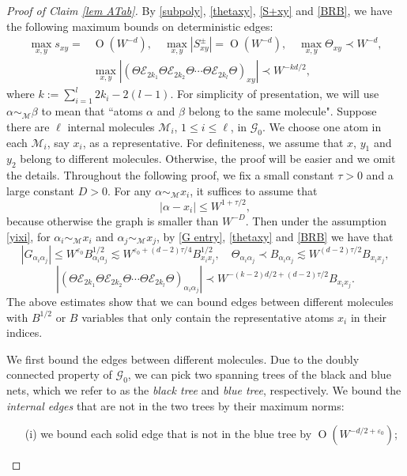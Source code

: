 \documentclass{article}
\newcommand{\1}{\mathds{1}}
\numberwithin{equation}{section}
\newcommand{\al}{\alpha}
\newcommand{\be}{\begin{equation}}
\newcommand{\ee}{\end{equation}}
\newcommand{\e}{{\varepsilon}}
\renewcommand{\cal}{\mathcal}
\renewcommand{\leq}{\leqslant}
\renewcommand{\le}{\leq}
\newcommand{\dashed}{\text{diffusive}}
\newcommand{\abs}{{\rm abs}}%
\DeclareMathOperator{\OO}{O}
\theoremstyle{plain} %
\theoremstyle{remark}
\newcommand{\Sele}{{\mathcal E}}
\begin{document}
\begin{proof}[Proof of Claim \ref{lem ATab}]
By \eqref{subpoly}, \eqref{thetaxy}, \eqref{S+xy} and \eqref{BRB}, we have the following maximum bounds on deterministic edges:
\be\label{Ssmall}\begin{split}
\max_{x,y}s_{xy} = & \OO   (W^{-d}), \quad  \max_{x,y}|S^{\pm}_{xy}|  = \OO(W^{-d}),\quad \max_{x,y}\Theta_{xy} \prec W^{-d}, \\
& \max_{x,y}\left|(\Theta \Sele_{2k_1}\Theta  \Sele_{2k_2}\Theta \cdots \Theta  \Sele_{2k_l}\Theta)_{xy}\right|  \prec W^{-kd /2 } ,
\end{split}
\ee
where $k:=\sum_{i=1}^l 2 k_i -2(l-1)$. For simplicity of presentation, we will use $\al\sim_{\cal M} \beta$ to mean that ``atoms $\al$ and $\beta$ belong to the same molecule". Suppose there are $\ell$ internal molecules $\cal M_i$, $1\le i \le \ell$, in $\cal G_0$. We choose one atom in each $\cal M_i$, say $x_i$, as a representative. %
For definiteness, we assume that $x$, $y_1$ and $y_2$ belong to different molecules. Otherwise, the proof will be easier and we omit the details. Throughout the following proof, we fix a small constant $\tau>0$ and a large constant $D>0$. For any $\al \sim_{\cal M}x_i$, it suffices to assume that
\be\label{yixi}
|\al-x_i|\le W^{1+\tau/2},
\ee
because otherwise the graph is smaller than $W^{-D}$. %
Then under the assumption \eqref{yixi}, for $\al_i\sim_{\cal M} x_i$ and $\al_j\sim_{\cal M} x_j$, by \eqref{G entry}, \eqref{thetaxy} and \eqref{BRB} we have that
\be\label{intermole1}|G_{\al_i \al_j}|\le W^{\e_0}B^{1/2}_{\al_i \al_j}\lesssim W^{\e_0+(d-2)\tau/4} B^{1/2}_{x_i x_j},\quad \Theta_{\al_i \al_j}\prec B_{\al_i \al_j} \lesssim W^{(d-2)\tau/2} B_{x_i x_j},\ee
\be\label{intermole2} \left|(\Theta \Sele_{2k_1}\Theta  \Sele_{2k_2}\Theta \cdots \Theta  \Sele_{2k_l}\Theta)_{\al_i \al_j}\right| \prec W^{-(k-2)d /2 + (d-2)\tau/2} B_{x_i x_j}. \ee
The above estimates show that we can bound edges between different molecules with $B^{1/2}$ or $B$ variables that only contain the representative atoms $x_i$ in their indices.


We first bound the edges between different molecules. Due to the doubly connected property of $\cal G_0$, we can pick two spanning trees of the black and blue nets, which we refer to as the \emph{black tree} and \emph{blue tree}, respectively. We bound the \emph{internal edges} that are not in the two trees by their maximum norms:
\begin{itemize}
	\item[(i)] we bound each solid edge that is not in the blue tree by $\OO(W^{-d/2+\e_0})$; %


\end{itemize}
\end{proof}
\end{document}
